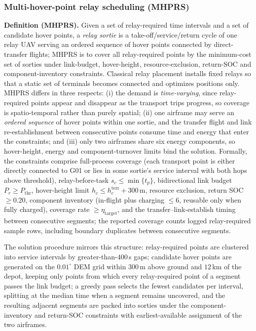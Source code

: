 \documentclass[journal]{IEEEtran}
\begin{document}
\subsubsection{Multi-hover-point relay scheduling (MHPRS)}
\textbf{Definition (MHPRS).} Given a set of relay-required time intervals and a
set of candidate hover points, a \emph{relay sortie} is a take-off/service/return
cycle of one relay UAV serving an ordered sequence of hover points connected by
direct-transfer flights; MHPRS is to cover all relay-required points by the
minimum-cost set of sorties under link-budget, hover-height, resource-exclusion,
return-SOC and component-inventory constraints.
Classical relay placement installs fixed relays so that a static set of
terminals becomes connected and optimizes positions only. MHPRS differs in three
respects: (i) the demand is \emph{time-varying}, since relay-required points
appear and disappear as the transport trips progress, so coverage is
spatio-temporal rather than purely spatial; (ii) one airframe may serve an
\emph{ordered sequence} of hover points within one sortie, and the transfer
flight and link re-establishment between consecutive points consume time and
energy that enter the constraints; and (iii) only two airframes share six energy
components, so hover-height, energy and component-turnover limits bind the
solution. Formally, the constraints comprise full-process coverage (each
transport point is either directly connected to G01 or lies in some sortie's
service interval with both hops above threshold), relay-before-task
$s_c\le\min\{t_p\}$, bidirectional link budget
$P_r\ge P_{\mathrm{thr}}$, hover-height limit
$h_c\le h^{\mathrm{terr}}_c+300$\,m, resource exclusion, return SOC $\ge0.20$,
component inventory (in-flight plus charging $\le6$, reusable only when fully
charged), coverage rate
$\ge\eta_{\mathrm{target}}$, and the transfer--link-establish timing between
consecutive segments; the reported coverage counts logged relay-required
sample rows, including boundary duplicates between consecutive segments.

The solution procedure mirrors this structure: relay-required points are
clustered into service intervals by greater-than-$400$\,s gaps; candidate hover
points are generated on the $0.01^\circ$ DEM grid within $300$\,m above ground
and $12$\,km of the depot, keeping only points from which every relay-required
point of a segment passes the link budget; a greedy pass selects the fewest
candidates per interval, splitting at the median time when a segment remains
uncovered, and the resulting adjacent segments are packed into sorties under the
component-inventory and return-SOC constraints with earliest-available assignment
of the two airframes.
\end{document}
